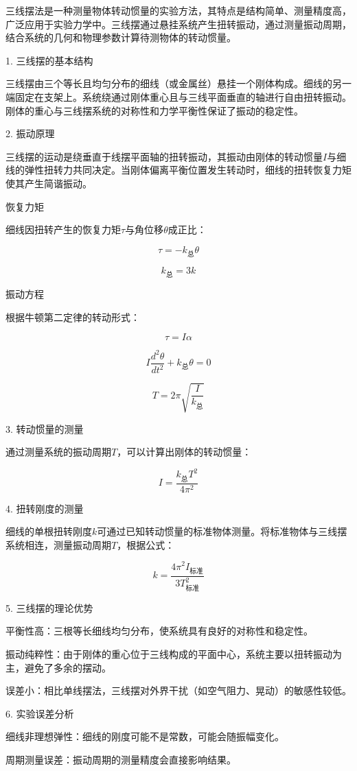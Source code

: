 \documentclass[12pt,hyperref,a4paper,UTF8]{ctexart}
\begin{document}
三线摆法是一种测量物体转动惯量的实验方法，其特点是结构简单、测量精度高，广泛应用于实验力学中。三线摆通过悬挂系统产生扭转振动，通过测量振动周期，结合系统的几何和物理参数计算待测物体的转动惯量。

1. 三线摆的基本结构

三线摆由三个等长且均匀分布的细线（或金属丝）悬挂一个刚体构成。细线的另一端固定在支架上。系统绕通过刚体重心且与三线平面垂直的轴进行自由扭转振动。刚体的重心与三线摆系统的对称性和力学平衡性保证了振动的稳定性。

2. 振动原理

三线摆的运动是绕垂直于线摆平面轴的扭转振动，其振动由刚体的转动惯量$I$与细线的弹性扭转力共同决定。当刚体偏离平衡位置发生转动时，细线的扭转恢复力矩使其产生简谐振动。

恢复力矩

细线因扭转产生的恢复力矩$\tau$与角位移$\theta$成正比：

$$ \tau = -k_{\text{总}} \theta $$

$$ k_{\text{总}} = 3k $$

振动方程

根据牛顿第二定律的转动形式：

$$ \tau = I \alpha $$

$$ I \frac{d^2\theta}{dt^2} + k_{\text{总}} \theta = 0 $$

$$ T = 2\pi \sqrt{\frac{I}{k_{\text{总}}}} $$

3. 转动惯量的测量

通过测量系统的振动周期$T$，可以计算出刚体的转动惯量：

$$ I = \frac{k_{\text{总}} T^2}{4\pi^2} $$

4. 扭转刚度的测量

细线的单根扭转刚度$k$可通过已知转动惯量的标准物体测量。将标准物体与三线摆系统相连，测量振动周期$T$，根据公式：

$$ k = \frac{4\pi^2 I_{\text{标准}}}{3T_{\text{标准}}^2} $$

5. 三线摆的理论优势

平衡性高：三根等长细线均匀分布，使系统具有良好的对称性和稳定性。

振动纯粹性：由于刚体的重心位于三线构成的平面中心，系统主要以扭转振动为主，避免了多余的摆动。

误差小：相比单线摆法，三线摆对外界干扰（如空气阻力、晃动）的敏感性较低。


6. 实验误差分析

细线非理想弹性：细线的刚度可能不是常数，可能会随振幅变化。

周期测量误差：振动周期的测量精度会直接影响结果。
\end{document}
